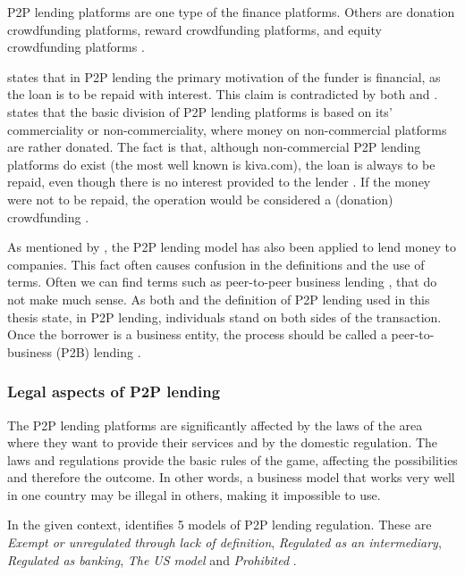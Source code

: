 P2P lending platforms are one type of the finance platforms. Others are donation crowdfunding platforms, reward crowdfunding platforms, and equity crowdfunding platforms \cite[]{Pierrakis2013}.

\cite{Pierrakis2013} states that in P2P lending the primary motivation of the funder is financial, as the loan is to be repaid with interest. This claim is contradicted by both \cite{Ashta2009} and \cite{Bachmann2011}. \cite{Bachmann2011} states that the basic division of P2P lending platforms is based on its' commerciality or non-commerciality, where money on non-commercial platforms are rather donated. The fact is that, although non-commercial P2P lending platforms do exist (the most well known is kiva.com), the loan is always to be repaid, even though there is no interest provided to the lender \cite[]{Ashta2009}. If the money were not to be repaid, the operation would be considered a (donation) crowdfunding \cite[]{Pierrakis2013}.

As mentioned by \cite{Pierrakis2013}, the P2P lending model has also been applied to lend money to companies. This fact often causes confusion in the definitions and the use of terms. Often we can find terms such as peer-to-peer business lending \cite[]{Ziegler2018}, that do not make much sense. As both \cite{Chaffee2012} and the definition of P2P lending used in this thesis state, in P2P lending, individuals stand on both sides of the transaction. Once the borrower is a business entity, the process should be called a peer-to-business (P2B) lending \cite[]{ecrowd!2017}. 

\subsubsection{Legal aspects of P2P lending}

The P2P lending platforms are significantly affected by the laws of the area where they want to provide their services and by the domestic regulation. The laws and regulations provide the basic rules of the game, affecting the possibilities and therefore the outcome. In other words, a business model that works very well in one country may be illegal in others, making it impossible to use.

In the given context, \cite{Kirby2014} identifies 5 models of P2P lending regulation. These are \textit{Exempt or unregulated through lack of definition}, \textit{Regulated as an intermediary}, \textit{Regulated as banking}, \textit{The US model} and \textit{Prohibited} \cite[For more details see][]{Kirby2014}.

